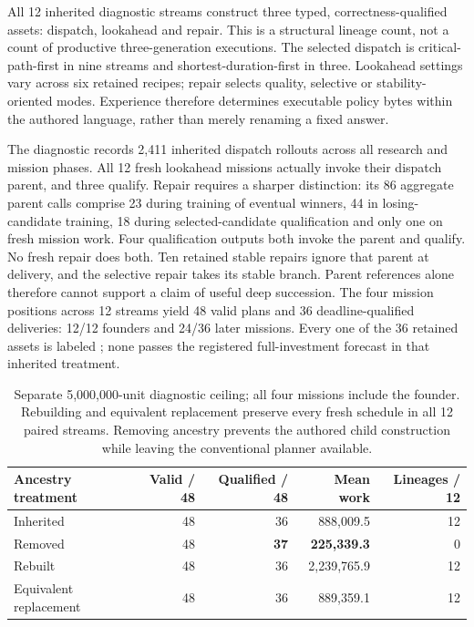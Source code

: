 All 12 inherited diagnostic streams construct three typed, correctness-qualified assets: dispatch, lookahead and repair. This is a structural lineage count, not a count of productive three-generation executions. The selected dispatch is critical-path-first in nine streams and shortest-duration-first in three. Lookahead settings vary across six retained recipes; repair selects quality, selective or stability-oriented modes. Experience therefore determines executable policy bytes within the authored language, rather than merely renaming a fixed answer.

The diagnostic records 2,411 inherited dispatch rollouts across all research and mission phases. All 12 fresh lookahead missions actually invoke their dispatch parent, and three qualify. Repair requires a sharper distinction: its 86 aggregate parent calls comprise 23 during training of eventual winners, 44 in losing-candidate training, 18 during selected-candidate qualification and only one on fresh mission work. Four qualification outputs both invoke the parent and qualify. No fresh repair does both. Ten retained stable repairs ignore that parent at delivery, and the selective repair takes its stable branch. Parent references alone therefore cannot support a claim of useful deep succession. The four mission positions across 12 streams yield 48 valid plans and 36 deadline-qualified deliveries: 12/12 founders and 24/36 later missions. Every one of the 36 retained assets is labeled ; none passes the registered full-investment forecast in that inherited treatment.

\begin{table}[ht]\centering\small
\begin{tabularx}{\linewidth}{Yrrrr}
\toprule
Ancestry treatment & Valid / 48 & Qualified / 48 & Mean work & Lineages / 12 \\
\midrule
Inherited & 48 & 36 & 888,009.5 & 12 \\
Removed & 48 & \textbf{37} & \textbf{225,339.3} & 0 \\
Rebuilt & 48 & 36 & 2,239,765.9 & 12 \\
Equivalent replacement & 48 & 36 & 889,359.1 & 12 \\
\bottomrule
\end{tabularx}
\caption{Separate 5,000,000-unit diagnostic ceiling; all four missions include the founder. Rebuilding and equivalent replacement preserve every fresh schedule in all 12 paired streams. Removing ancestry prevents the authored child construction while leaving the conventional planner available.}
\end{table}


